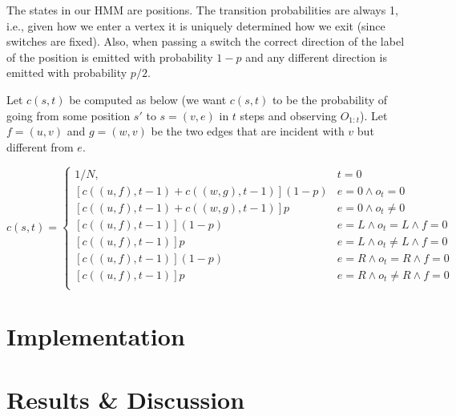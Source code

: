\documentclass[a4paper,11pt]{kth-mag}
\begin{document}
    The states in our HMM are positions. The transition probabilities are
    always 1, i.e., given how we enter a vertex it is uniquely determined how
    we exit (since switches are fixed). Also, when passing a switch the correct
    direction of the label of the position is emitted with probability $1-p$
    and any different direction is emitted with probability $p/2$.

    Let $c(s,t)$ be computed as below (we want $c(s,t)$ to be the probability
    of going from some position $s'$ to $s=(v,e)$ in $t$ steps and observing
    $O_{1:t}$). Let $f=(u,v)$ and $g=(w,v)$ be the two edges that are incident
    with $v$ but different from $e$.

    \begin{equation}
        c(s,t) =
        \begin{cases}
            1/N, & t = 0 \\
            \left[c((u,f),t-1) + c((w,g),t-1)\right](1-p) & e = 0 \wedge o_t = 0 \\
            \left[c((u,f),t-1) + c((w,g),t-1)\right]p     & e = 0 \wedge o_t \neq 0 \\
            \left[c((u,f),t-1)               \right](1-p) & e = L \wedge o_t = L \wedge f = 0 \\
            \left[c((u,f),t-1)               \right]p     & e = L \wedge o_t \neq L \wedge f = 0 \\
            \left[c((u,f),t-1)               \right](1-p) & e = R \wedge o_t = R \wedge f = 0 \\
            \left[c((u,f),t-1)               \right]p     & e = R \wedge o_t \neq R \wedge f = 0 \\
        \end{cases}
    \end{equation}

    \chapter{Implementation}
        
    \chapter{Results \& Discussion}
        
\end{document}
